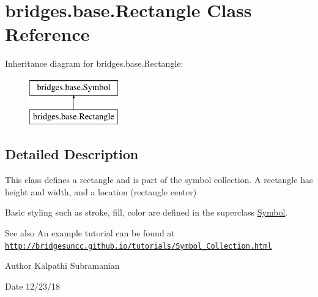\hypertarget{classbridges_1_1base_1_1_rectangle}{}\section{bridges.\+base.\+Rectangle Class Reference}
\label{classbridges_1_1base_1_1_rectangle}
Inheritance diagram for bridges.\+base.\+Rectangle\+:\begin{figure}[H]
\begin{center}
\leavevmode
\includegraphics[height=2.000000cm]{classbridges_1_1base_1_1_rectangle}
\end{center}
\end{figure}


\subsection{Detailed Description}
This class defines a rectangle and is part of the symbol collection. A rectangle has height and width, and a location (rectangle center) 

Basic styling such as stroke, fill, color are defined in the superclass \hyperlink{classbridges_1_1base_1_1_symbol}{Symbol}.

\begin{DoxySeeAlso}{See also}
An example tutorial can be found at \href{http://bridgesuncc.github.io/tutorials/Symbol_Collection.html}{\tt http\+://bridgesuncc.\+github.\+io/tutorials/\+Symbol\+\_\+\+Collection.\+html} 
\end{DoxySeeAlso}
\begin{DoxyAuthor}{Author}
Kalpathi Subramanian 
\end{DoxyAuthor}
\begin{DoxyDate}{Date}
12/23/18 
\end{DoxyDate}
